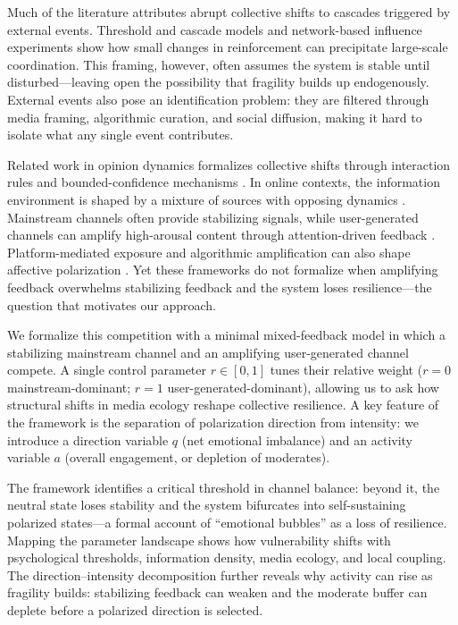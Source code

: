 \documentclass[11pt]{article}
\begin{document}
Much of the literature attributes abrupt collective shifts to cascades triggered by external events. Threshold and cascade models \citep{Granovetter1978,Watts2002,CentolaMacy2007,WattsDodds2007,Nyborg2016} and network-based influence experiments \citep{Centola2010,Becker2017} show how small changes in reinforcement can precipitate large-scale coordination. This framing, however, often assumes the system is stable until disturbed---leaving open the possibility that fragility builds up endogenously. External events also pose an identification problem: they are filtered through media framing, algorithmic curation, and social diffusion, making it hard to isolate what any single event contributes.

Related work in opinion dynamics formalizes collective shifts through interaction rules and bounded-confidence mechanisms \citep{Castellano2009,Deffuant2000,HegselmannKrause2002,HolleyLiggett1975,SoodRedner2005,Baronchelli2018,SchweitzerGarcia2010}. In online contexts, the information environment is shaped by a mixture of sources with opposing dynamics \citep{Chadwick2017}. Mainstream channels often provide stabilizing signals, while user-generated channels can amplify high-arousal content through attention-driven feedback \citep{Bakshy2015,DelVicario2016SciRep,Vosoughi2018,Piao2023}. Platform-mediated exposure and algorithmic amplification can also shape affective polarization \citep{Bail2018,Tornberg2022,Cinelli2021,Ribeiro2020,PennycookRand2021}. Yet these frameworks do not formalize when amplifying feedback overwhelms stabilizing feedback and the system loses resilience---the question that motivates our approach.

We formalize this competition with a minimal mixed-feedback model in which a stabilizing mainstream channel and an amplifying user-generated channel compete. A single control parameter $r\in[0,1]$ tunes their relative weight ($r=0$ mainstream-dominant; $r=1$ user-generated-dominant), allowing us to ask how structural shifts in media ecology reshape collective resilience. A key feature of the framework is the separation of polarization direction from intensity: we introduce a direction variable $q$ (net emotional imbalance) and an activity variable $a$ (overall engagement, or depletion of moderates).

The framework identifies a critical threshold in channel balance: beyond it, the neutral state loses stability and the system bifurcates into self-sustaining polarized states---a formal account of ``emotional bubbles'' as a loss of resilience. Mapping the parameter landscape shows how vulnerability shifts with psychological thresholds, information density, media ecology, and local coupling. The direction--intensity decomposition further reveals why activity can rise as fragility builds: stabilizing feedback can weaken and the moderate buffer can deplete before a polarized direction is selected.
\end{document}
